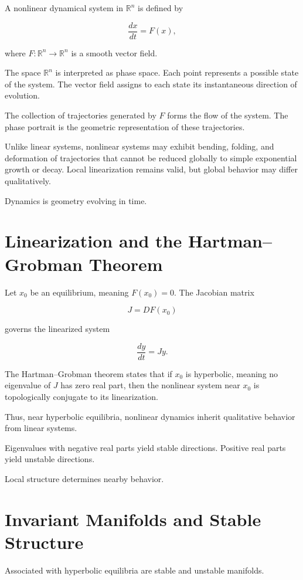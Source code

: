 \documentclass[12pt]{book}
\begin{document}
A nonlinear dynamical system in $\mathbb{R}^n$ is defined by

\[
\frac{dx}{dt} = F(x),
\]

where $F : \mathbb{R}^n \to \mathbb{R}^n$ is a smooth vector field.

The space $\mathbb{R}^n$ is interpreted as phase space. Each point represents a possible state of the system. The vector field assigns to each state its instantaneous direction of evolution.

The collection of trajectories generated by $F$ forms the flow of the system. The phase portrait is the geometric representation of these trajectories.

Unlike linear systems, nonlinear systems may exhibit bending, folding, and deformation of trajectories that cannot be reduced globally to simple exponential growth or decay. Local linearization remains valid, but global behavior may differ qualitatively.

Dynamics is geometry evolving in time.

\section{Linearization and the Hartman--Grobman Theorem}

Let $x_0$ be an equilibrium, meaning $F(x_0) = 0$. The Jacobian matrix

\[
J = DF(x_0)
\]

governs the linearized system

\[
\frac{dy}{dt} = Jy.
\]

The Hartman--Grobman theorem states that if $x_0$ is hyperbolic, meaning no eigenvalue of $J$ has zero real part, then the nonlinear system near $x_0$ is topologically conjugate to its linearization.

Thus, near hyperbolic equilibria, nonlinear dynamics inherit qualitative behavior from linear systems.

Eigenvalues with negative real parts yield stable directions. Positive real parts yield unstable directions.

Local structure determines nearby behavior.

\section{Invariant Manifolds and Stable Structure}

Associated with hyperbolic equilibria are stable and unstable manifolds.
\end{document}

